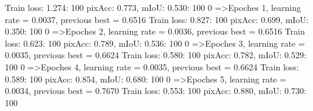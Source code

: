     Train loss: 1.274: 100%
pixAcc: 0.773, mIoU: 0.530: 100%
  0%
=>Epoches 1, learning rate = 0.0037,                 previous best = 0.6516
Train loss: 0.827: 100%
pixAcc: 0.699, mIoU: 0.350: 100%
  0%
=>Epoches 2, learning rate = 0.0036,                 previous best = 0.6516
Train loss: 0.623: 100%
pixAcc: 0.789, mIoU: 0.536: 100%
  0%
=>Epoches 3, learning rate = 0.0035,                 previous best = 0.6624
Train loss: 0.580: 100%
pixAcc: 0.782, mIoU: 0.529: 100%
  0%
=>Epoches 4, learning rate = 0.0035,                 previous best = 0.6624
Train loss: 0.589: 100%
pixAcc: 0.854, mIoU: 0.680: 100%
  0%
=>Epoches 5, learning rate = 0.0034,                 previous best = 0.7670
Train loss: 0.553: 100%
pixAcc: 0.880, mIoU: 0.730: 100%
